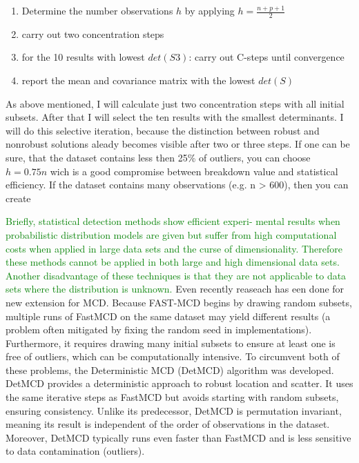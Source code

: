 \begin{enumerate}
    \item Determine the number observations $h$ by applying $h = \frac{n+p+1}{2}$
    \item carry out two concentration steps
    \item for the 10 results with lowest $det(S3)$: carry out C-steps until convergence
    \item report the mean and covariance matrix with the lowest $det(S)$
\end{enumerate}

As above mentioned, I will calculate just two concentration steps with all initial subsets.
After that I will select the ten results with the smallest determinants.
I will do this selective iteration, because the distinction between robust and nonrobust solutions aleady becomes visible after two or three steps.  
If one can be sure, that the dataset contains less then 25\% of outliers, you can choose $h=0.75n$ wich is a good compromise between breakdown value and statistical efficiency.
If the dataset contains many observations (e.g. n > 600), then you can create

\textcolor{green}{
Briefly, statistical detection methods show efficient experi-
mental results when probabilistic distribution models are given
but suffer from high computational costs when applied in large
data sets and the curse of dimensionality. Therefore these methods
cannot be applied in both large and high dimensional data sets.
Another disadvantage of these techniques is that they are not
applicable to data sets where the distribution is unknown. \citep[p.5]{smiti2020critical}
}
Even recently reaseach has een done for new extension for MCD.
Because FAST-MCD begins by drawing random subsets, multiple runs of FastMCD on the same dataset may yield different results (a problem often mitigated by fixing the random seed in implementations). 
Furthermore, it requires drawing many initial subsets to ensure at least one is free of outliers, which can be computationally intensive. 
To circumvent both of these problems, the Deterministic MCD (DetMCD) algorithm was developed. \citep[p.621 pp.]{hubert2012deterministic}
DetMCD provides a deterministic approach to robust location and scatter. 
It uses the same iterative steps as FastMCD but avoids starting with random subsets, ensuring consistency. 
Unlike its predecessor, DetMCD is permutation invariant, meaning its result is independent of the order of observations in the dataset. 
Moreover, DetMCD typically runs even faster than FastMCD and is less sensitive to data contamination (outliers).


